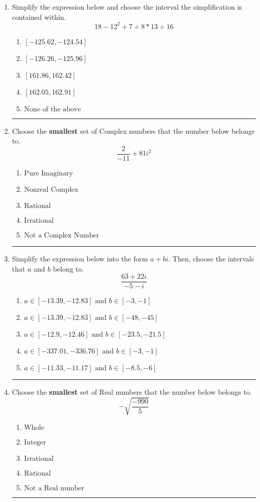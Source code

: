 \documentclass[14pt]{extbook}
\newcommand{\litem}[1]{\item#1\hspace*{-1cm}\rule{\textwidth}{0.4pt}}
\begin{document}
\begin{enumerate}
{\begin{enumerate}[label=\Alph*.]
\end{enumerate} }
\litem{
Simplify the expression below and choose the interval the simplification is contained within.\[ 18 - 12^2 + 7 \div 8 * 13 \div 16 \]\begin{enumerate}[label=\Alph*.]
\item \( [-125.62, -124.54] \)
\item \( [-126.26, -125.96] \)
\item \( [161.86, 162.42] \)
\item \( [162.05, 162.91] \)
\item \( \text{None of the above} \)

\end{enumerate} }
\litem{
Choose the \textbf{smallest} set of Complex numbers that the number below belongs to.\[ \frac{2}{-11}+81i^2 \]\begin{enumerate}[label=\Alph*.]
\item \( \text{Pure Imaginary} \)
\item \( \text{Nonreal Complex} \)
\item \( \text{Rational} \)
\item \( \text{Irrational} \)
\item \( \text{Not a Complex Number} \)

\end{enumerate} }
\litem{
Simplify the expression below into the form $a+bi$. Then, choose the intervals that $a$ and $b$ belong to.\[ \frac{63 + 22 i}{-5 - i} \]\begin{enumerate}[label=\Alph*.]
\item \( a \in [-13.39, -12.83] \text{ and } b \in [-3, -1] \)
\item \( a \in [-13.39, -12.83] \text{ and } b \in [-48, -45] \)
\item \( a \in [-12.9, -12.46] \text{ and } b \in [-23.5, -21.5] \)
\item \( a \in [-337.01, -336.76] \text{ and } b \in [-3, -1] \)
\item \( a \in [-11.33, -11.17] \text{ and } b \in [-8.5, -6] \)

\end{enumerate} }
\litem{
Choose the \textbf{smallest} set of Real numbers that the number below belongs to.\[ -\sqrt{\frac{-990}{5}} \]\begin{enumerate}[label=\Alph*.]
\item \( \text{Whole} \)
\item \( \text{Integer} \)
\item \( \text{Irrational} \)
\item \( \text{Rational} \)
\item \( \text{Not a Real number} \)


\end{enumerate}}
\end{enumerate}
\end{document}
